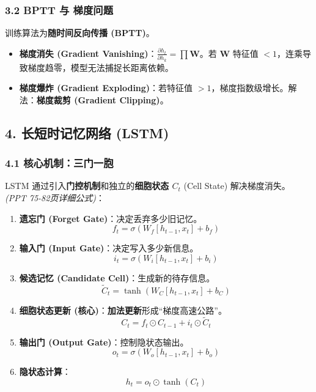 \documentclass[a4paper, 11pt]{ctexart}
\begin{document}
\subsubsection{3.2 BPTT 与 梯度问题}
训练算法为\textbf{随时间反向传播 (BPTT)}。
\begin{itemize}
    \item \textbf{梯度消失 (Gradient Vanishing)}：$\frac{\partial h_t}{\partial h_k} = \prod \mathbf{W}$。若 $\mathbf{W}$ 特征值 $<1$，连乘导致梯度趋零，模型无法捕捉长距离依赖。
    \item \textbf{梯度爆炸 (Gradient Exploding)}：若特征值 $>1$，梯度指数级增长。解法：\textbf{梯度裁剪 (Gradient Clipping)}。
\end{itemize}

\subsection{4. 长短时记忆网络 (LSTM)}

\subsubsection{4.1 核心机制：三门一胞}
LSTM 通过引入\textbf{门控机制}和独立的\textbf{细胞状态 $C_t$} (Cell State) 解决梯度消失。
\textit{(PPT 75-82页详细公式)}：

\begin{enumerate}
    \item \textbf{遗忘门 (Forget Gate)}：决定丢弃多少旧记忆。
    $$ f_t = \sigma(W_f [h_{t-1}, x_t] + b_f) $$
    \item \textbf{输入门 (Input Gate)}：决定写入多少新信息。
    $$ i_t = \sigma(W_i [h_{t-1}, x_t] + b_i) $$
    \item \textbf{候选记忆 (Candidate Cell)}：生成新的待存信息。
    $$ \tilde{C}_t = \tanh(W_C [h_{t-1}, x_t] + b_C) $$
    \item \textbf{细胞状态更新 (核心)}：\textbf{加法更新}形成“梯度高速公路”。
    $$ C_t = f_t \odot C_{t-1} + i_t \odot \tilde{C}_t $$
    \item \textbf{输出门 (Output Gate)}：控制隐状态输出。
    $$ o_t = \sigma(W_o [h_{t-1}, x_t] + b_o) $$
    \item \textbf{隐状态计算}：
    $$ h_t = o_t \odot \tanh(C_t) $$
\end{enumerate}
\end{document}

